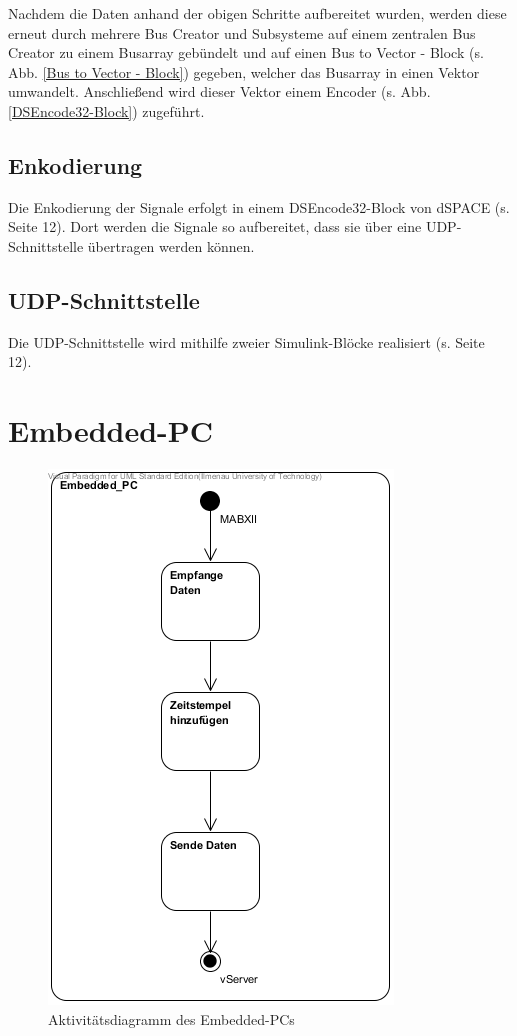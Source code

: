 \documentclass[fontsize = 12pt, paper = a4]{scrreprt}
\begin{document}
Nachdem die Daten anhand der obigen Schritte aufbereitet wurden, werden diese erneut durch mehrere Bus Creator und Subsysteme auf einem zentralen Bus Creator zu einem Busarray gebündelt und auf einen Bus to Vector - Block (s. Abb. \ref{Bus to Vector - Block}) gegeben, welcher das Busarray in einen Vektor umwandelt. Anschließend wird dieser Vektor einem Encoder (s. Abb. \ref{DSEncode32-Block}) zugeführt.

\subsection{Enkodierung}

Die Enkodierung der Signale erfolgt in einem DSEncode32-Block von dSPACE (s. Seite 12). Dort werden die Signale so aufbereitet, dass sie über eine UDP-Schnittstelle übertragen werden können. 

\subsection{UDP-Schnittstelle} 

Die UDP-Schnittstelle wird mithilfe zweier Simulink-Blöcke realisiert (s. Seite 12). 

\newpage

\section{Embedded-PC}

\begin{figure}[h]
\centering
\includegraphics[scale = 0.70]{activity_embedded_pc.png}
\caption[Aktivitätsdiagramm Embedded-PC]{Aktivitätsdiagramm des Embedded-PCs}
\end{figure} 
\end{document}
